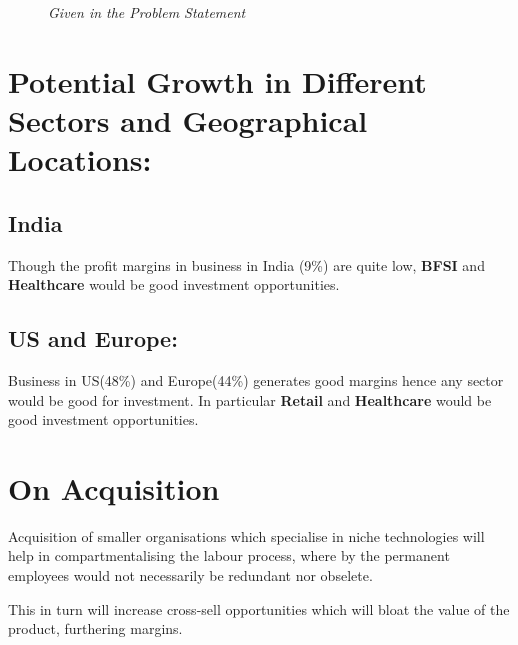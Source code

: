 \documentclass{report}
\begin{document}
\begin{figure}[h!]
        \caption{\emph{Given in the Problem Statement}}
    \end{figure}
    \newpage
\section{Potential Growth in Different Sectors and Geographical Locations:}

\subsection{India}
Though the profit margins in business in India (9\%) are quite low, \textbf{BFSI} and \textbf{Healthcare} would be good investment opportunities.
  
\subsection{US and Europe:}
Business in US(48\%) and Europe(44\%) generates good margins hence any sector would be good for investment. In particular \textbf{Retail} and \textbf{Healthcare} would be good investment opportunities.

\section{On Acquisition}
Acquisition of smaller organisations which specialise in niche technologies will help in compartmentalising the labour process, where by the permanent employees would not necessarily be redundant nor obselete.

This in turn will increase cross-sell opportunities which will bloat the value of the product, furthering margins.
\end{document}
